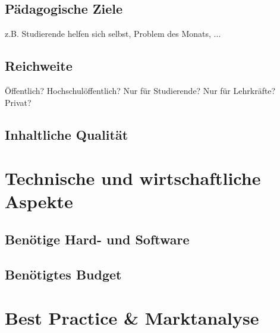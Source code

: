 
\subsection{Pädagogische Ziele} %
\label{sub:padagogische_ziele}
z.B. Studierende helfen sich selbst, Problem des Monats, ...

\subsection{Reichweite} %
\label{sub:reichweite}
Öffentlich? Hochschulöffentlich? Nur für Studierende? Nur für Lehrkräfte? Privat?

\subsection{Inhaltliche Qualität} %
\label{sub:inhaltliche_qualitat}



\section{Technische und wirtschaftliche Aspekte} %
\label{sec:technische_und_wirtschaftliche_aspekte}

\subsection{Benötige Hard- und Software} %
\label{sub:benotige_hard_und_software}


\subsection{Benötigtes Budget} %
\label{sub:benotigtes_budget}



\section{Best Practice \& Marktanalyse} %
\label{sec:best_practice}

